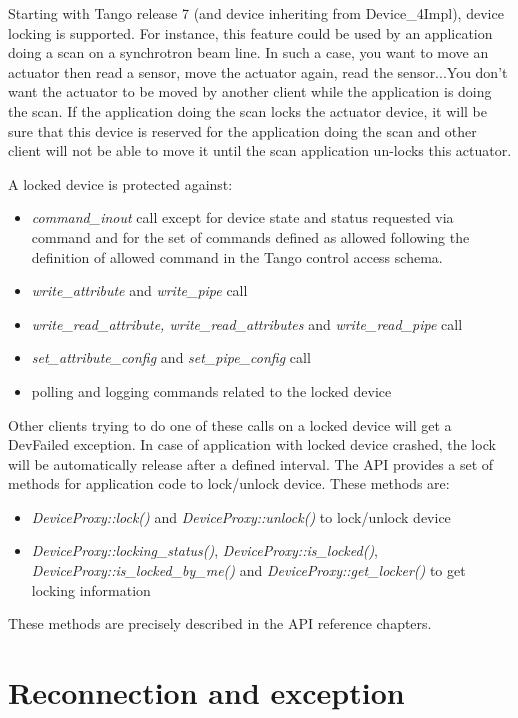 Starting with Tango release 7 (and device inheriting from Device\_4Impl),
device locking is supported. For instance, this feature could be used
by an application doing a scan on a synchrotron beam line. In such
a case, you want to move an actuator then read a sensor, move the
actuator again, read the sensor...You don't want the actuator to be
moved by another client while the application is doing the scan. If
the application doing the scan locks the actuator device, it will
be sure that this device is \textquotedbl{}reserved\textquotedbl{}
for the application doing the scan and other client will not be able
to move it until the scan application un-locks this actuator.

A locked device is protected against:
\begin{itemize}
\item \emph{command\_inout} call except for device state and status requested
via command and for the set of commands defined as allowed following
the definition of allowed command in the Tango control access schema.
\item \emph{write\_attribute} and \emph{write\_pipe} call
\item \emph{write\_read\_attribute, write\_read\_attributes} and \emph{write\_read\_pipe}
call
\item \emph{set\_attribute\_config }and\emph{ set\_pipe\_config} call
\item polling and logging commands related to the locked device
\end{itemize}
Other clients trying to do one of these calls on a locked device will
get a DevFailed exception. In case of application with locked device
crashed, the lock will be automatically release after a defined interval.
The API provides a set of methods for application code to lock/unlock
device. These methods are:
\begin{itemize}
\item \emph{DeviceProxy::lock()} and \emph{DeviceProxy::unlock()} to lock/unlock
device
\item \emph{DeviceProxy::locking\_status()}, \emph{DeviceProxy::is\_locked()},
\emph{DeviceProxy::is\_locked\_by\_me()} and \emph{DeviceProxy::get\_locker()}
to get locking information
\end{itemize}
These methods are precisely described in the API reference chapters.


\section{Reconnection and exception}

